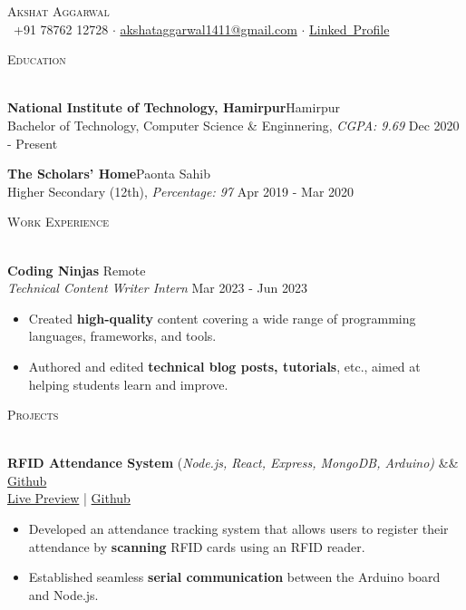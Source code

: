 \documentclass[a4paper]{article}
\newcommand{\bulletSep} { \vspace{2.5mm} }
\newcommand{\sectionSep} { \vspace{4mm} }
\newcommand{\lineunder} {
    \vspace*{-8pt} \\
    \hspace*{-15pt} \hrulefill \\
}
\newcommand{\header} [1] {
    {\hspace*{-18pt}\vspace*{6pt} {
        \fontfamily{qcs}\selectfont \large \scshape #1
    }}
    \vspace*{-6pt} \lineunder
    \vspace{0.5mm}
}
\newcommand{\educationItem}[5]{
    \textbf{#1}\hfill #2\\
    #3, \textit{#4} \hfill #5\\
}
\newcommand{\experienceItem}[5]{
    \textbf{#1} \hfill #2 \\
    \textit{#3} \hfill #4 \\
    \begin{itemize}
        #5
    \end{itemize}
}
\newcommand{\projectItem}[5]{
    {\textbf{#1}} {(\sl #2)}\hfill
    \ifx&#3&%
    \href{#4}{Github}\\
    \else
    \href{#3}{Live Preview} | \href{#4}{Github}\\
    \fi
    \begin{itemize}
        #5
    \end{itemize}
}
\begin{document}

\begin{center}
    {\Huge \scshape {}\selectfont Akshat Aggarwal}\\
    \vspace{0.5mm}
    \faPhone~+91 78762 12728
    $\cdot$
    \href{mailto:akshataggarwal1411@gmail.com}{akshataggarwal1411@gmail.com}
    $\cdot$
    \href{https://www.linkedin.com/in/akshataggarwal1411/}{Linked\faLinkedinSquare~Profile}
\end{center}

\vspace{-2mm}


\header{Education}

\educationItem{National Institute of Technology, Hamirpur}{Hamirpur}{Bachelor of Technology, Computer Science \& Enginnering}{CGPA: 9.69}{Dec 2020 - Present}
\bulletSep

\educationItem{The Scholars' Home}{Paonta Sahib}{Higher Secondary (12th)}{Percentage: 97}{Apr 2019 - Mar 2020}
\sectionSep


\header{Work Experience}

\experienceItem{Coding Ninjas}{Remote}{Technical Content Writer Intern}{Mar 2023 - Jun 2023}{
    \item Created \textbf{high-quality} content covering a wide range of programming languages, frameworks, and tools.
    \item Authored and edited \textbf{technical blog posts, tutorials}, etc., aimed at helping students learn and improve.
}
\bulletSep



\header{Projects}

\projectItem{RFID Attendance System}{Node.js, React, Express, MongoDB, Arduino}{}{https://github.com/AkshatAggarwal14/RFID-Attendance-system}{
    \item Developed an attendance tracking system that allows users to register their attendance by \textbf{scanning} RFID cards using an RFID reader.
    \item Established seamless \textbf{serial communication} between the Arduino board and Node.js.
}
\bulletSep
\end{document}
